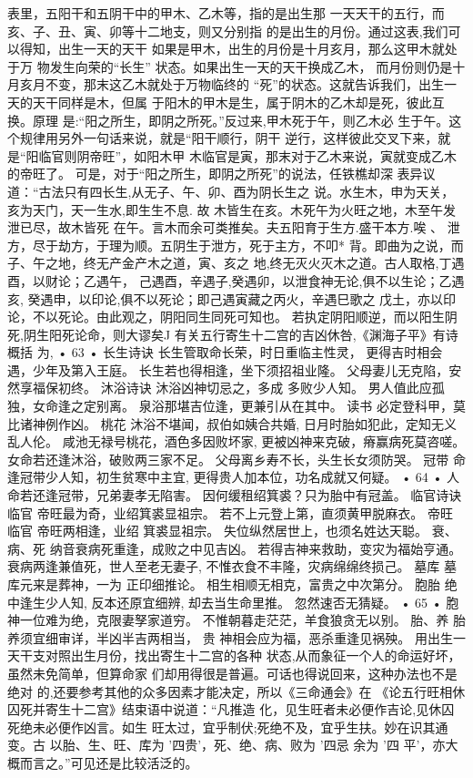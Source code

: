 表里，五阳干和五阴干中的甲木、乙木等，指的是出生那
一天天干的五行，而亥、子、丑、寅、卯等十二地支，则又分别指
的是出生的月份。通过这表,我们可以得知，出生一天的天干
如果是甲木，出生的月份是十月亥月，那么这甲木就处于万
物发生向荣的“长生” 状态。如果出生一天的天干换成乙木，
而月份则仍是十月亥月不变，那末这乙木就处于万物临终的
“死”的状态。这就告诉我们，出生一天的天干同样是木，但属
于阳木的甲木是生，属于阴木的乙木却是死，彼此互换。原理
是:“阳之所生，即阴之所死。”反过来,甲木死于午，则乙木必
生于午。这个规律用另外一句话来说，就是“阳干顺行，阴干
逆行，这样彼此交叉下来，就是“阳临官则阴帝旺”，如阳木甲
木临官是寅，那末对于乙木来说，寅就变成乙木的帝旺了。
可是，对于“阳之所生，即阴之所死”的说法，任铁樵却深
表异议道：“古法只有四长生,从无子、午、卯、酉为阴长生之
说。水生木，申为天关，亥为天门，天一生水,即生生不息. 故
木皆生在亥。木死午为火旺之地，木至午发泄已尽，故木皆死
在午。言木而余可类推矣。夫五阳育于生方.盛干本方.唉 、
泄方，尽于劫方，于理为顺。五阴生于泄方，死于主方，不叩*
背。即曲为之说，而子、午之地，终无产金产木之道，寅、亥之
地,终无灭火灭木之道。古人取格,丁遇酉，以财论；乙遇午，
己遇酉，辛遇子,癸遇卯，以泄食神无论,俱不以生论；乙遇亥,
癸遇申，以印论,俱不以死论；即己遇寅藏之丙火，辛遇巳歌之
戊土，亦以印论，不以死论。由此观之，阴阳同生同死可知也。
若执定阴阳顺逆，而以阳生阴死,阴生阳死论命，则大谬矣J
有关五行寄生十二宫的吉凶休咎,《渊海子平》有诗概括
为,
• 63 •
长生诗诀
长生管取命长荣，时日重临主性灵，
更得吉时相会遇，少年及第入王庭。
长生若也得相逢，坐下须招祖业隆。
父母妻儿无克陷，安然享福保初终。
沐浴诗诀
沐浴凶神切忌之，多成 多败少人知。
男人值此应孤独，女命逢之定别离。
泉浴那堪吉位逢，更兼引从在其中。
读书 必定登科甲，莫比诸神例作凶。
桃花 沐浴不堪闻，叔伯如姨合共婚,
日月时胎如犯此，定知无义乱人伦。
咸池无禄号桃花，酒色多因败坏家,
更被凶神来克破，瘠赢病死莫咨嗟。
女命若还逢沐浴，破败两三家不足。
父母离乡寿不长，头生长女须防哭。
冠带
命逢冠带少人知，初生贫寒中主宜,
更得贵人加本位，功名成就又何疑。
• 64 •
人命若还逢冠带，兄弟妻孝无陷害。
因何缓租绍箕裘？只为胎中有冠盖。
临官诗诀
临官 帝旺最为奇，业绍箕裘显祖宗。
若不上元登上第，直须黄甲脱麻衣。
帝旺
临官 帝旺两相逢，业绍 箕裘显祖宗。
失位纵然居世上，也须名姓达天聪。
衰、病、死
纳音衰病死重逢，成败之中见吉凶。
若得吉神来救助，变灾为福始亨通。
衰病两逢兼值死，世人至老无妻子,
不惟衣食不丰隆，灾病绵绵终损己。
墓库
墓库元来是葬神，一为 正印细推论。
相生相顺无相克，富贵之中次第分。
胞胎
绝中逢生少人知,
反本还原宜细辨,
却去当生命里推。
忽然速否无猜疑。
• 65 •
胞神一位难为绝，克限妻孥家道穷。
不惟朝暮走茫茫，羊食狼贪无以别。
胎、养
胎养须宜细审详，半凶半吉两相当，
贵 神相会应为福，恶杀重逢见祸殃。
用出生一天干支对照出生月份，找出寄生十二宫的各种
状态,从而象征一个人的命运好坏，虽然未免简单，但算命家
们却用得很是普遍。可话也得说回来，这种办法也不是绝对
的,还要参考其他的众多因素才能决定，所以《三命通会》在
《论五行旺相休囚死并寄生十二宫》结束语中说道：“凡推造
化，见生旺者未必便作吉论,见休囚死绝未必便作凶言。如生
旺太过，宜乎制伏;死绝不及，宜乎生扶。妙在识其通变。古
以胎、生、旺、库为 '四贵'，死、绝、病、败为 '四忌 余为 '四
平'，亦大概而言之。”可见还是比较活泛的。

